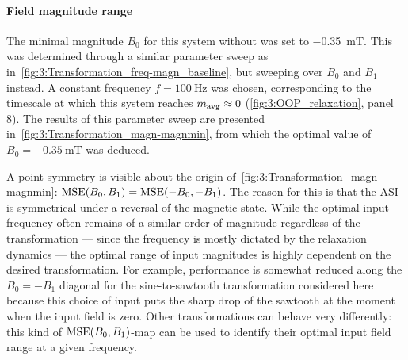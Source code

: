 \paragraph{Field magnitude range}
The minimal  magnitude $B_0$ for this system without  was set to \SI{-0.35}{\milli\tesla}.
This was determined through a similar parameter sweep as in~\cref{fig:3:Transformation_freq-magn_baseline}, but sweeping over $B_0$ and $B_1$ instead.
A constant frequency $f=\SI{100}{\hertz}$ was chosen, corresponding to the timescale at which this system reaches $m_\mathrm{avg} \approx 0$ (\cref{fig:3:OOP_relaxation}, panel 8).
The results of this parameter sweep are presented in~\cref{fig:3:Transformation_magn-magnmin}, from which the optimal value of $B_0=\SI{-0.35}{\milli\tesla}$ was deduced.

\vspace{-1em}

A point symmetry is visible about the origin of~\cref{fig:3:Transformation_magn-magnmin}: $\mathrm{MSE}(B_0, B_1) = \mathrm{MSE}(-B_0, -B_1)$.
The reason for this is that the ASI is symmetrical under a reversal of the magnetic state.
While the optimal input frequency often remains of a similar order of magnitude regardless of the transformation --- since the frequency is mostly dictated by the relaxation dynamics --- the optimal range of input  magnitudes is highly dependent on the desired transformation.
For example, performance is somewhat reduced along the $B_0 = -B_1$ diagonal for the sine-to-sawtooth transformation considered here because this choice of input puts the sharp drop of the sawtooth at the moment when the input field is zero.
Other transformations can behave very differently: this kind of $\mathrm{MSE}(B_0, B_1)$-map can be used to identify their optimal input field range at a given frequency.

